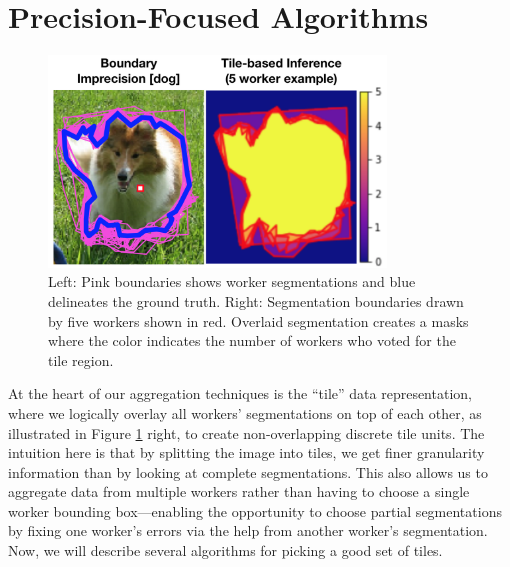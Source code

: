 \section{Precision-Focused Algorithms\label{sec:precision}}%
\begin{figure}[h!]
\vspace{-10pt}
\centering
\includegraphics[width=0.8\textwidth]{plots/precision_issue_tile_example.png}
\caption{Left: Pink boundaries shows worker segmentations and blue delineates the ground truth. Right: Segmentation boundaries drawn by five workers shown in red. Overlaid segmentation creates a masks where the color indicates the number of workers who voted for the tile region.}
\label{tile_demo}
\end{figure}
At the heart of our aggregation techniques is the ``tile'' data representation, where we logically overlay all workers' segmentations on top of each other, as illustrated in Figure \ref{tile_demo} right, to create non-overlapping discrete tile units. The intuition here is that by splitting the image into tiles, we get finer granularity information than by looking at complete segmentations. This also allows us to aggregate data from multiple workers rather than having to choose a single worker bounding box---enabling the opportunity to choose partial segmentations by fixing one worker's errors via the help from another worker's segmentation. Now, we will describe several algorithms for picking a good set of tiles.

